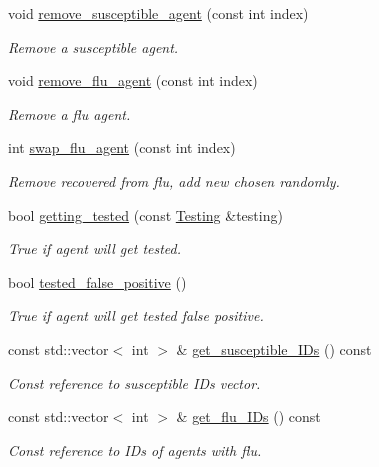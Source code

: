 \begin{DoxyCompactItemize}
void \hyperlink{classFlu_ace749e39454ab8afd3fda5de94b9ff98}{remove\+\_\+susceptible\+\_\+agent} (const int index)
\begin{DoxyCompactList}\small\item\em Remove a susceptible agent. \end{DoxyCompactList}\item 
void \hyperlink{classFlu_a0106ecf7ba7e6db8f2b3cd5b5715537f}{remove\+\_\+flu\+\_\+agent} (const int index)
\begin{DoxyCompactList}\small\item\em Remove a flu agent. \end{DoxyCompactList}\item 
int \hyperlink{classFlu_a98293f770a941b92441d0db70fd97fb6}{swap\+\_\+flu\+\_\+agent} (const int index)
\begin{DoxyCompactList}\small\item\em Remove recovered from flu, add new chosen randomly. \end{DoxyCompactList}\item 
bool \hyperlink{classFlu_ab3eb12e70200001b11df26362206fbff}{getting\+\_\+tested} (const \hyperlink{classTesting}{Testing} \&testing)
\begin{DoxyCompactList}\small\item\em True if agent will get tested. \end{DoxyCompactList}\item 
bool \hyperlink{classFlu_ad5a3f4a140a364c4367063ba919af7b1}{tested\+\_\+false\+\_\+positive} ()
\begin{DoxyCompactList}\small\item\em True if agent will get tested false positive. \end{DoxyCompactList}\item 
const std\+::vector$<$ int $>$ \& \hyperlink{classFlu_ad635a41f158bb3941636059cf9eb911e}{get\+\_\+susceptible\+\_\+\+I\+Ds} () const
\begin{DoxyCompactList}\small\item\em Const reference to susceptible I\+Ds vector. \end{DoxyCompactList}\item 
const std\+::vector$<$ int $>$ \& \hyperlink{classFlu_a0e3acb295714b07d612580b7e7c8091c}{get\+\_\+flu\+\_\+\+I\+Ds} () const
\begin{DoxyCompactList}\small\item\em Const reference to I\+Ds of agents with flu. \end{DoxyCompactList}\end{DoxyCompactItemize}


